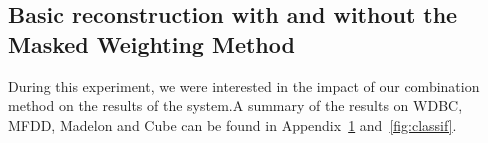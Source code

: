     \subsection{Basic reconstruction with and without the Masked Weighting Method}
\label{sec:msemrd}
	
During this experiment, we were interested in the impact of our combination method on the results of the system.\@ A summary of the results on WDBC, MFDD, Madelon and Cube can be found in Appendix~\ref{fig:msemrd} and~\ref{fig:classif}.

\begin{figure}[h]
\label{fig:msemrd}
    \centering
    \qquad
    \\

\end{figure}
